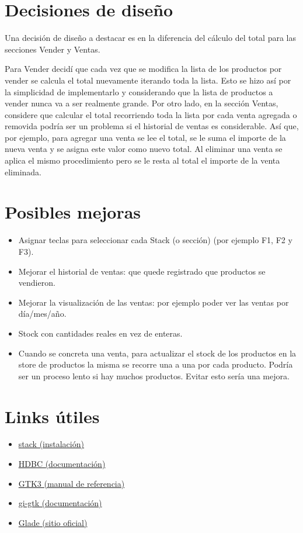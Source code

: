 \documentclass[a4paper,10pt]{article}
\begin{document}
\section{Decisiones de diseño}
Una decisión de diseño a destacar es en la diferencia del cálculo del total para las secciones Vender y Ventas. 

Para Vender decidí que cada vez que se modifica la lista de los productos por vender se calcula el total nuevamente iterando toda la lista. Esto se hizo así por la simplicidad de implementarlo y considerando que la lista de productos a vender nunca va a ser realmente grande.
\newpage
Por otro lado, en la sección Ventas, considere que calcular el total recorriendo toda la lista por cada venta agregada o removida podría ser un problema si el historial de ventas es considerable. Así que, por ejemplo, para agregar una venta se lee el total, se le suma el importe de la nueva venta y se asigna este valor como nuevo total. Al eliminar una venta se aplica el mismo procedimiento pero se le resta al total el importe de la venta eliminada.

\section{Posibles mejoras}
\begin{itemize}
	\item Asignar teclas para seleccionar cada Stack (o sección) (por ejemplo F1, F2 y F3).
	\item Mejorar el historial de ventas: que quede registrado que productos se vendieron.
	\item Mejorar la visualización de las ventas: por ejemplo poder ver las ventas por día/mes/año.
	\item Stock con cantidades reales en vez de enteras.
	\item Cuando se concreta una venta, para actualizar el stock de los productos en la store de productos la misma se recorre una a una por cada producto. Podría ser un proceso lento si hay muchos productos. Evitar esto sería una mejora.
\end{itemize}

\section{Links útiles}
\begin{itemize}
	\item \href{https://docs.haskellstack.org/en/stable/install_and_upgrade/}{stack (instalación)}
	\item \href{https://hackage.haskell.org/package/HDBC-2.4.0.3/docs/Database-HDBC.html}{HDBC (documentación)}
	\item \href{https://developer.gnome.org/gtk3/stable/}{GTK3 (manual de referencia)}
	\item \href{https://hackage.haskell.org/package/gi-gtk-3.0.33}{gi-gtk (documentación)}
	\item \href{https://glade.gnome.org/}{Glade (sitio oficial)}
\end{itemize}
\end{document}
